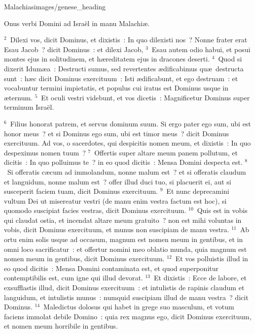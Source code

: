 {Malachias}{images/genese_heading}


\lettrine[lines=10,image=true,loversize=0.05,lraise=-0.03]{O}{}nus verbi Domini ad Isra\"el in manu Malachi\ae .


${}^{2}$~Dilexi vos, dicit Dominus, et dixistis~: In quo dilexisti nos~? Nonne frater erat Esau Jacob~? dicit Dominus~: et dilexi Jacob,
${}^{3}$~Esau autem odio habui, et posui montes ejus in solitudinem, et h\ae reditatem ejus in dracones deserti.
${}^{4}$~Quod si dixerit Idum\ae a~: Destructi sumus, sed revertentes \ae dificabimus qu\ae\ destructa sunt~: h\ae c dicit Dominus exercituum~: Isti \ae dificabunt, et ego destruam~: et vocabuntur termini impietatis, et populus cui iratus est Dominus usque in \ae ternum.
${}^{5}$~Et oculi vestri videbunt, et vos dicetis~: Magnificetur Dominus super terminum Isra\"el.


${}^{6}$~Filius honorat patrem, et servus dominum suum. Si ergo pater ego sum, ubi est honor meus~? et si Dominus ego sum, ubi est timor meus~? dicit Dominus exercituum. Ad vos, o sacerdotes, qui despicitis nomen meum, et dixistis~: In quo despeximus nomen tuum~?
${}^{7}$~Offertis super altare meum panem pollutum, et dicitis~: In quo polluimus te~? in eo quod dicitis~: Mensa Domini despecta est.
${}^{8}$~Si offeratis c\ae cum ad immolandum, nonne malum est~? et si offeratis claudum et languidum, nonne malum est~? offer illud duci tuo, si placuerit ei, aut si susceperit faciem tuam, dicit Dominus exercituum.
${}^{9}$~Et nunc deprecamini vultum Dei ut misereatur vestri (de manu enim vestra factum est hoc), si quomodo suscipiat facies vestras, dicit Dominus exercituum.
${}^{10}$~Quis est in vobis qui claudat ostia, et incendat altare meum gratuito~? non est mihi voluntas in vobis, dicit Dominus exercituum, et munus non suscipiam de manu vestra.
${}^{11}$~Ab ortu enim solis usque ad occasum, magnum est nomen meum in gentibus, et in omni loco sacrificatur~: et offertur nomini meo oblatio munda, quia magnum est nomen meum in gentibus, dicit Dominus exercituum.
${}^{12}$~Et vos polluistis illud in eo quod dicitis~: Mensa Domini contaminata est, et quod superponitur contemptibilis est, cum igne qui illud devorat.
${}^{13}$~Et dixistis~: Ecce de labore, et exsufflastis illud, dicit Dominus exercituum~: et intulistis de rapinis claudum et languidum, et intulistis munus~: numquid suscipiam illud de manu vestra~? dicit Dominus.
${}^{14}$~Maledictus dolosus qui habet in grege suo masculum, et votum faciens immolat debile Domino~: quia rex magnus ego, dicit Dominus exercituum, et nomen meum horribile in gentibus.

